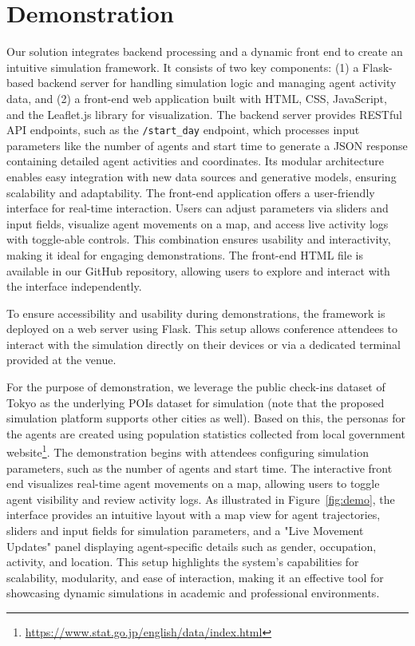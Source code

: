 \section{Demonstration}
Our solution integrates backend processing and a dynamic front end to create an intuitive simulation framework. It consists of two key components: (1) a Flask-based backend server for handling simulation logic and managing agent activity data, and (2) a front-end web application built with HTML, CSS, JavaScript, and the Leaflet.js library for visualization. 
The backend server provides RESTful API endpoints, such as the \texttt{/start\_day} endpoint, which processes input parameters like the number of agents and start time to generate a JSON response containing detailed agent activities and coordinates. 
Its modular architecture enables easy integration with new data sources and generative models, ensuring scalability and adaptability.
The front-end application offers a user-friendly interface for real-time interaction. Users can adjust parameters via sliders and input fields, visualize agent movements on a map, and access live activity logs with toggle-able controls. This combination ensures usability and interactivity, making it ideal for engaging demonstrations. The front-end HTML file is available in our GitHub repository, allowing users to explore and interact with the interface independently.

To ensure accessibility and usability during demonstrations, the framework is deployed on a web server using Flask. This setup allows conference attendees to interact with the simulation directly on their devices or via a dedicated terminal provided at the venue.

For the purpose of demonstration, we leverage the public check-ins dataset of Tokyo as the underlying POIs dataset for simulation (note that the proposed simulation platform supports other cities as well). Based on this, the personas for the agents are created
using population statistics collected from local government
website\footnote{\url{https://www.stat.go.jp/english/data/index.html}}.
The demonstration begins with attendees configuring simulation parameters, such as the number of agents and start time. The interactive front end visualizes real-time agent movements on a map, allowing users to toggle agent visibility and review activity logs. As illustrated in Figure~\ref{fig:demo}, the interface provides an intuitive layout with a map view for agent trajectories, sliders and input fields for simulation parameters, and a "Live Movement Updates" panel displaying agent-specific details such as gender, occupation, activity, and location. This setup highlights the system's capabilities for scalability, modularity, and ease of interaction, making it an effective tool for showcasing dynamic simulations in academic and professional environments.

